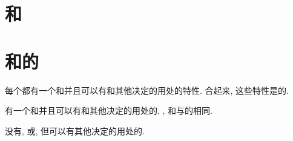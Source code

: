 \chapter{\Attribute{}\Declaration{}和\Specification{}}

\chapter{\Procedure{}和\Data{}\Object{}的\Attribute{}}

每个\Data{}\Object{}都有一个\Type{}和\Rank{}并且可以有\TypeParameter{}和其他决定\Object{}的用处的特性. 合起来, 这些特性是\Object{}的\Attribute{}.

\Function{}有一个\Type{}和\Rank{}并且可以有\TypeParameter{}和其他决定\Function{}的用处的\Attribute{}. \Type{}, \Rank{}和\TypeParameter{}与\Function{}\Result{}的相同.

\Subroutine{}没有\Type{}, \Rank{}或\TypeParameter{}, 但可以有其他决定\Subroutine{}的用处的\Attribute{}.



